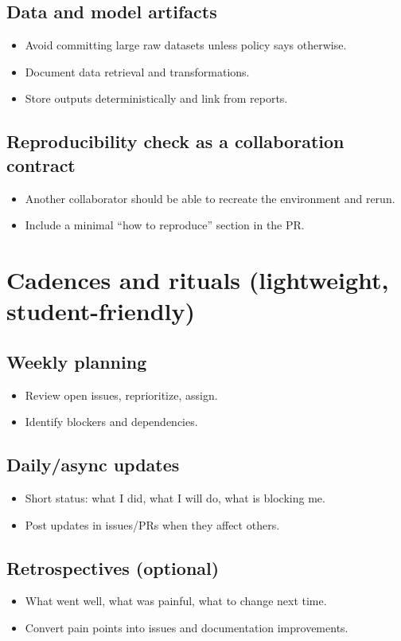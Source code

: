\subsection{Data and model artifacts}
\begin{itemize}
\item Avoid committing large raw datasets unless policy says otherwise.
\item Document data retrieval and transformations.
\item Store outputs deterministically and link from reports.
\end{itemize}

\subsection{Reproducibility check as a collaboration contract}
\begin{itemize}
\item Another collaborator should be able to recreate the environment and rerun.
\item Include a minimal ``how to reproduce'' section in the PR.
\end{itemize}

\section{Cadences and rituals (lightweight, student-friendly)}
\subsection{Weekly planning}
\begin{itemize}
\item Review open issues, reprioritize, assign.
\item Identify blockers and dependencies.
\end{itemize}

\subsection{Daily/async updates}
\begin{itemize}
\item Short status: what I did, what I will do, what is blocking me.
\item Post updates in issues/PRs when they affect others.
\end{itemize}

\subsection{Retrospectives (optional)}
\begin{itemize}
\item What went well, what was painful, what to change next time.
\item Convert pain points into issues and documentation improvements.
\end{itemize}

